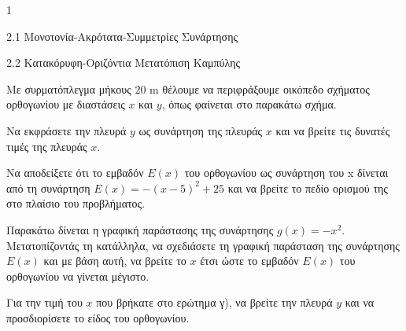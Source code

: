 \begin{ylh}{1}
\item 2.1 Μονοτονία-Ακρότατα-Συμμετρίες Συνάρτησης
\item 2.2 Κατακόρυφη-Οριζόντια Μετατόπιση Καμπύλης
\end{ylh}
Με συρματόπλεγμα μήκους 20 m θέλουμε να περιφράξουμε οικόπεδο σχήματος ορθογωνίου με διαστάσεις $x$ και $y$, όπως φαίνεται στο παρακάτω σχήμα.
\begin{alist}
\item Να εκφράσετε την πλευρά $y$ ως συνάρτηση της πλευράς $x$ και να βρείτε τις δυνατές τιμές της πλευράς $x$.
\item Να αποδείξετε ότι το εμβαδόν $E(x)$ του ορθογωνίου ως συνάρτηση του x δίνεται από τη συνάρτηση $E(x) = -(x - 5)^2 + 25$ και να βρείτε το πεδίο ορισμού της στο πλαίσιο του προβλήματος.
\item Παρακάτω δίνεται η γραφική παράστασης της συνάρτησης $g(x) = -x^2$. Μετατοπίζοντάς τη κατάλληλα, να σχεδιάσετε τη γραφική παράσταση της συνάρτησης $E(x)$ και με βάση αυτή, να βρείτε το $x$ έτσι ώστε το εμβαδόν $E(x)$ του ορθογωνίου να γίνεται μέγιστο.
\item Για την τιμή του $x$ που βρήκατε στο ερώτημα γ), να βρείτε την πλευρά $y$ και να προσδιορίσετε το είδος του ορθογωνίου.
\begin{center}
\end{center}
\end{alist}


